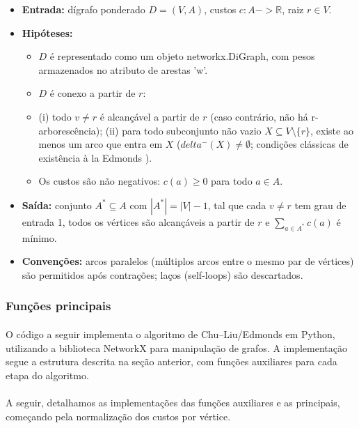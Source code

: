 \documentclass[12pt,a4paper]{article}
\def\texttt#1{#1}%
\def\to{->}%
\def\delta{delta}%
\begin{document}
\begin{itemize}\setlength{\itemsep}{2pt}
    \item \textbf{Entrada:} dígrafo ponderado \(D=(V,A)\), custos \(c:A\to\mathbb{R}\), raiz \(r\in V\).
    \item \textbf{Hipóteses:}
          \begin{itemize}\setlength{\itemsep}{2pt}
              \item \(D\) é representado como um objeto \texttt{networkx.DiGraph}, com pesos armazenados no atributo de arestas \texttt{'w'}.
              \item \(D\) é conexo a partir de \(r\):
              \item (i) todo \(v\neq r\) é alcançável a partir de \(r\) (caso contrário, não há r-arborescência); (ii) para todo subconjunto não vazio \(X\subseteq V\setminus\{r\}\), existe ao menos um arco que entra em \(X\) (\(\delta^-(X)\neq\emptyset\); condições clássicas de existência \`a la Edmonds \cite{schrijver2003comb}).
              \item Os custos são não negativos: \(c(a)\ge 0\) para todo \(a\in A\).
          \end{itemize}
    \item \textbf{Saída:} conjunto \(A^*\subseteq A\) com \(|A^*|=|V|-1\), tal que cada \(v\neq r\) tem grau de entrada 1, todos os vértices são alcançáveis a partir de \(r\) e \(\sum_{a\in A^*} c(a)\) é mínimo.
    \item \textbf{Convenções:} arcos paralelos (múltiplos arcos entre o mesmo par de vértices) são permitidos após contrações; laços (self-loops) são descartados.
\end{itemize}


\subsubsection{Funções principais}

\paragraph{}
O código a seguir implementa o algoritmo de Chu–Liu/Edmonds em Python, utilizando a biblioteca NetworkX para manipulação de grafos. A implementação segue a estrutura descrita na seção anterior, com funções auxiliares para cada etapa do algoritmo.

\paragraph{}
A seguir, detalhamos as implementações das funções auxiliares e as principais, começando pela normalização dos custos por vértice.
\end{document}
